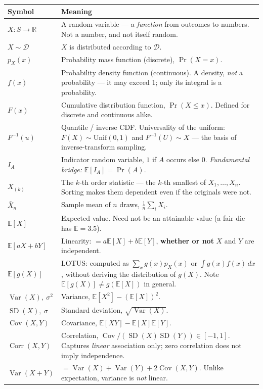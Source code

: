 \documentclass[10pt,letterpaper,onecolumn]{article}
\makeatletter
\newenvironment{symtab}
  {\begin{longtable}{@{}>{\raggedright\arraybackslash}p{0.26\textwidth}%
                       >{\raggedright\arraybackslash}p{0.70\textwidth}@{}}
   \toprule
   \textbf{Symbol} & \textbf{Meaning} \\
   \midrule
   \endhead
   \bottomrule
   \endfoot}
  {\end{longtable}}
\makeatother
\begin{document}
\begin{symtab}
$X : S \to \mathbb{R}$ & A random variable — a \emph{function} from outcomes to numbers. Not a number, and not itself random. \\
$X \sim \mathcal{D}$ & $X$ is distributed according to $\mathcal{D}$. \\
$p_X(x)$ & Probability mass function (discrete), $\Pr(X = x)$. \\
$f(x)$ & Probability density function (continuous). A density, \emph{not} a probability — it may exceed $1$; only its integral is a probability. \\
$F(x)$ & Cumulative distribution function, $\Pr(X \le x)$. Defined for discrete and continuous alike. \\
$F^{-1}(u)$ & Quantile / inverse CDF. Universality of the uniform: $F(X)\sim\mathrm{Unif}(0,1)$ and $F^{-1}(U)\sim X$ — the basis of inverse-transform sampling. \\
$I_A$ & Indicator random variable, $1$ if $A$ occurs else $0$. \emph{Fundamental bridge:} $\mathbb{E}[I_A] = \Pr(A)$. \\
$X_{(k)}$ & The $k$-th order statistic — the $k$-th smallest of $X_1,\dots,X_n$. Sorting makes them dependent even if the originals were not. \\
$\bar X_n$ & Sample mean of $n$ draws, $\tfrac1n\sum_i X_i$. \\
$\mathbb{E}[X]$ & Expected value. Need not be an attainable value (a fair die has $\mathbb{E}=3.5$). \\
$\mathbb{E}[aX+bY]$ & Linearity: $= a\mathbb{E}[X]+b\mathbb{E}[Y]$, \textbf{whether or not} $X$ and $Y$ are independent. \\
$\mathbb{E}[g(X)]$ & LOTUS: computed as $\sum_x g(x)p_X(x)$ or $\int g(x)f(x)\,dx$, without deriving the distribution of $g(X)$. Note $\mathbb{E}[g(X)] \ne g(\mathbb{E}[X])$ in general. \\
$\operatorname{Var}(X),\ \sigma^2$ & Variance, $\mathbb{E}[X^2]-(\mathbb{E}[X])^2$. \\
$\operatorname{SD}(X),\ \sigma$ & Standard deviation, $\sqrt{\operatorname{Var}(X)}$. \\
$\operatorname{Cov}(X,Y)$ & Covariance, $\mathbb{E}[XY]-\mathbb{E}[X]\mathbb{E}[Y]$. \\
$\operatorname{Corr}(X,Y)$ & Correlation, $\operatorname{Cov}/(\operatorname{SD}(X)\operatorname{SD}(Y)) \in [-1,1]$. Captures \emph{linear} association only; zero correlation does not imply independence. \\
$\operatorname{Var}(X+Y)$ & $=\operatorname{Var}(X)+\operatorname{Var}(Y)+2\operatorname{Cov}(X,Y)$. Unlike expectation, variance is \emph{not} linear. \\

\end{symtab}
\end{document}
